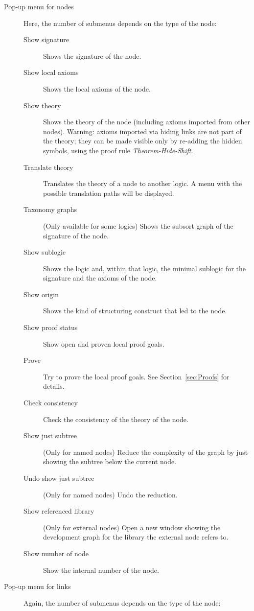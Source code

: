 \documentclass{article}
\begin{document}
\begin{description}
\begin{description}
\end{description}
\item[Pop-up menu for nodes]
Here, the number of submenus depends on the type of the node:
\begin{description}
\item[Show signature] Shows the signature of the node.
\item[Show local axioms] Shows the local axioms of the node.
\item[Show theory] Shows the theory of the node (including axioms
imported from other nodes). Warning: axioms imported via hiding  links
are not part of the theory; they can be made visible only by re-adding
the hidden symbols, using the proof rule \emph{Theorem-Hide-Shift}.
\item[Translate theory] Translates the theory of a node to another logic.
A menu with the possible translation paths will be displayed.
\item[Taxonomy graphs] (Only available for some logics) Shows the subsort graph of the signature of the node.
\item[Show sublogic] Shows the logic and, within that logic, the minimal sublogic
for the signature and the axioms of the node.
\item[Show origin] Shows the kind of \CASL structuring construct that
led to the node.
\item[Show proof status] Show open and proven local proof goals.
\item[Prove] Try to prove the local proof goals. See Section~\ref{sec:Proofs} 
for details.
\item[Check consistency] Check the consistency of the theory of the node.
\item[Show just subtree] (Only for named nodes) Reduce the complexity
of the graph by just showing the subtree below the current node.
\item[Undo show just subtree] (Only for named nodes) Undo the reduction.
\item[Show referenced library] (Only for external nodes) Open a new window
showing the development graph for the library the external node refers to.
\item[Show number of node] Show the internal number of the node.
\end{description}
\item[Pop-up menu for links]
Again, the number of submenus depends on the type of the node:

\end{description}
\end{document}
